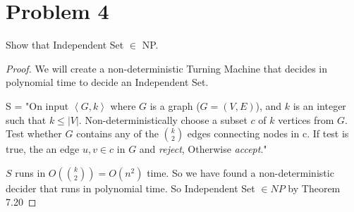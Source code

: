 \documentclass[11pt]{article}
\begin{document}
\newpage
\section*{Problem 4}

Show that Independent Set $\in$ NP.
\newline
\begin{proof}
We will create a non-deterministic Turning Machine that decides in polynomial time to decide an Independent Set.

\noindent
S = "On input $\left<G,k\right>$ where $G$ is a graph ($G = (V,E)$), and $k$ is an integer such that $k \leq |V|$. Non-deterministically choose a subset $c$ of $k$ vertices from $G$. Test whether $G$ contains any of the $k \choose 2$ edges connecting nodes in c. If test is true, the an edge $u,v \in c $ in $G$ and \textit{reject}, Otherwise \textit{accept}."


\noindent
$S$ runs in $O({k \choose 2}) = O(n^2)$ time. So we have found a non-deterministic decider that runs in polynomial time. So Independent Set $\in NP$ by Theorem 7.20 

\end{proof}
\end{document}
